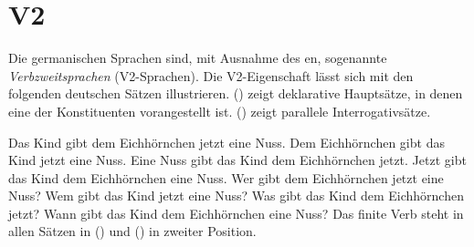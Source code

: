 \begin{table}
\caption{Konstituentenabfolge-Typologie der germanischen Sprachen nach \citet[]{Schallert2007a}}\label{table-VO-OV}
\end{table}

\section{V2}
\label{sec-phenomenon-v2}

Die germanischen Sprachen sind, mit Ausnahme des en, sogenannte \emph{Verbzweitsprachen} (V2-Sprachen).
Die V2-Eigenschaft
lässt sich mit den folgenden deutschen Sätzen illustrieren. () zeigt deklarative Hauptsätze,
in denen eine der Konstituenten vorangestellt ist. () zeigt parallele Interrogativsätze.

\eal
\ex
Das Kind gibt dem Eichhörnchen jetzt eine Nuss.\german
\ex
Dem Eichhörnchen gibt das Kind jetzt eine Nuss.
\ex
Eine Nuss gibt das Kind dem Eichhörnchen jetzt.
\ex
Jetzt gibt das Kind dem Eichhörnchen eine Nuss.
\zl
\eal
\ex
Wer gibt dem Eichhörnchen jetzt eine Nuss?\german
\ex
Wem gibt das Kind jetzt eine Nuss?
\ex
Was gibt das Kind dem Eichhörnchen jetzt?
\ex
Wann gibt das Kind dem Eichhörnchen eine Nuss?
\zl
Das finite Verb steht in allen Sätzen in () und () in zweiter Position.


